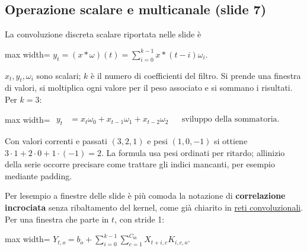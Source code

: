 \documentclass[11pt,a4paper,oneside,openany]{book}
\begin{document}
\subsection{Operazione scalare e multicanale (slide 7)}\label{f04-r53}

La convoluzione discreta scalare riportata nelle slide è

\begin{center}
\begin{adjustbox}{max width=\linewidth}
$\displaystyle \boxed{y_t=(x*\omega)(t)=\sum_{i=0}^{k-1}x*(t-i)\omega_i.}$
\end{adjustbox}
\end{center}

\(x_t,y_t,\omega_i\) sono scalari; \(k\) è il numero di coefficienti del filtro. Si prende una finestra di valori, si moltiplica ogni valore per il peso associato e si sommano i risultati. Per \(k=3\):

\begin{center}
\begin{adjustbox}{max width=\linewidth}
$\displaystyle 
\begin{aligned}
y_t&=x_t\omega_0+x_{t-1}\omega_1+x_{t-2}\omega_2
&&\text{sviluppo della sommatoria}.
\end{aligned}
$
\end{adjustbox}
\end{center}

Con valori correnti e passati \((3,2,1)\) e pesi \((1,0,-1)\) si ottiene \(3\cdot1+2\cdot0+1\cdot(-1)=2\). La formula usa pesi ordinati per ritardo; all\textquotesingle inizio della serie occorre precisare come trattare gli indici mancanti, per esempio mediante padding.

Per l\textquotesingle esempio a finestre delle slide è più comoda la notazione di \textbf{correlazione incrociata} senza ribaltamento del kernel, come già chiarito in \hyperref[fonte02]{reti convoluzionali}. Per una finestra che parte in \(t\), con stride 1:

\begin{center}
\begin{adjustbox}{max width=\linewidth}
$\displaystyle \boxed{Y_{t,o}=b_o+\sum_{i=0}^{k-1}\sum_{c=1}^{C_{\mathrm{in}}}X_{t+i,c}K_{i,c,o}.}$
\end{adjustbox}
\end{center}
\end{document}
